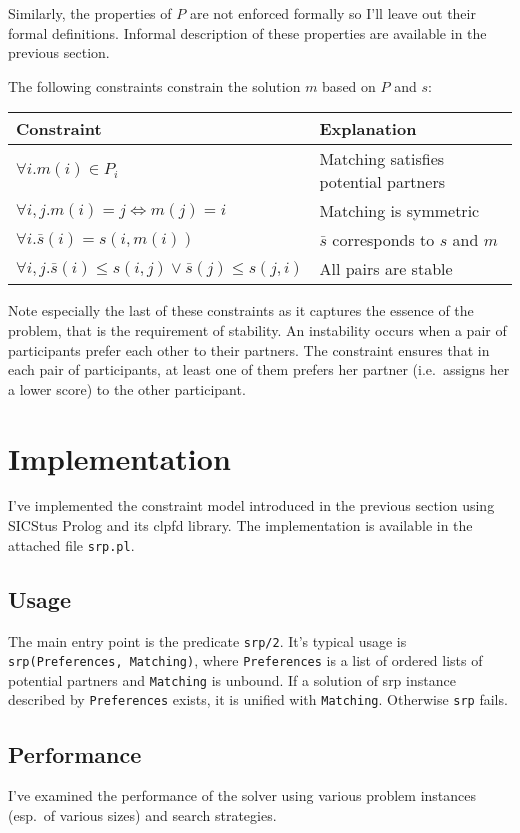 \documentclass{article}
\newcommand{\file}[1]{\texttt{#1}}
\newcommand{\code}[1]{\texttt{#1}}
\newcommand{\clpfd}{\acrshort{clpfd}}
\newcommand{\prolog}{Prolog}
\newcommand{\sicstusprolog}{SICStus \prolog{}}
\newcommand{\srp}{\acrshort{srp}}
\begin{document}
Similarly, the properties of $P$ are not enforced formally so I'll leave out their
formal definitions.
Informal description of these properties are available in the previous section.

The following constraints constrain the solution $m$ based on $P$ and $s$:

\begin{tabular}{l | l}
Constraint & Explanation \\
\hline
$\forall i. m(i) \in P_i$ & Matching satisfies potential partners \\
$\forall i,j. m(i) = j \Leftrightarrow m(j) = i$ & Matching is symmetric \\
$\forall i. \bar{s}(i) = s(i, m(i))$ & $\bar{s}$ corresponds to $s$ and $m$ \\
$\forall i,j. \bar{s}(i) \leq s(i,j) \vee \bar{s}(j) \leq s(j,i)$ & All pairs are stable
\end{tabular}

Note especially the last of these constraints
as it captures the essence of the problem, that is the requirement of stability.
An instability occurs when a pair of participants prefer each other to their partners.
The constraint ensures that in each pair of participants,
at least one of them prefers her partner (i.e.~assigns her a lower score)
to the other participant.

\section{Implementation}
I've implemented the constraint model introduced in the previous section
using \sicstusprolog{} and its \clpfd{} library.
The implementation is available in the attached file \file{srp.pl}.

\subsection{Usage}
The main entry point is the predicate \code{srp/2}.
It's typical usage is \code{srp(Preferences, Matching)},
where \code{Preferences} is a list of ordered lists of potential partners
and \code{Matching} is unbound.
If a solution of \srp{} instance described by \code{Preferences} exists,
it is unified with \code{Matching}.
Otherwise \code{srp} fails.

\subsection{Performance}
I've examined the performance of the solver using various problem instances
(esp.~of various sizes) and search strategies.
\end{document}
